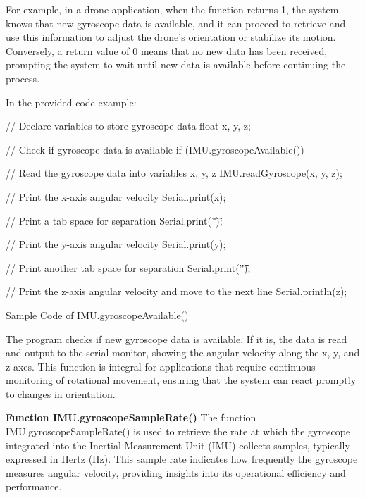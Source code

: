 For example, in a drone application, when the function returns 1, the system knows that new gyroscope data is available, and it can proceed to retrieve and use this information to adjust the drone's orientation or stabilize its motion. Conversely, a return value of 0 means that no new data has been received, prompting the system to wait until new data is available before continuing the process.

In the provided code example:\newline
\begin{code}[h!]
	\begin{Arduino}
	// Declare variables to store gyroscope data
	float x, y, z;
	
	// Check if gyroscope data is available
	if (IMU.gyroscopeAvailable()) {
		// Read the gyroscope data into variables x, y, z
		IMU.readGyroscope(x, y, z);
		
		// Print the x-axis angular velocity
		Serial.print(x);
		
		// Print a tab space for separation
		Serial.print('\t');
		
		// Print the y-axis angular velocity
		Serial.print(y);
		
		// Print another tab space for separation
		Serial.print('\t');
		
		// Print the z-axis angular velocity and move to the next line
		Serial.println(z);
	}
	
	\end{Arduino}
\caption{Sample Code of IMU.gyroscopeAvailable()}\label{code:IMU.gyroscopeAvailable()}
\end{code}
The program checks if new gyroscope data is available. If it is, the data is read and output to the serial monitor, showing the angular velocity along the x, y, and z axes.
This function is integral for applications that require continuous monitoring of rotational movement, ensuring that the system can react promptly to changes in orientation.

\textbf{Function IMU.gyroscopeSampleRate()}
The function IMU.gyroscopeSampleRate() is used to retrieve the rate at which the gyroscope integrated into the Inertial Measurement Unit (IMU) collects samples, typically expressed in Hertz (Hz). This sample rate indicates how frequently the gyroscope measures angular velocity, providing insights into its operational efficiency and performance.

